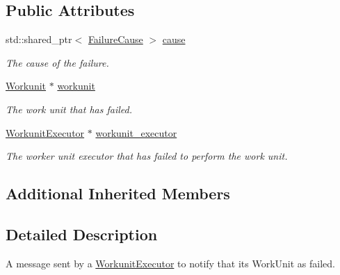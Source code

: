 \subsection*{Public Attributes}
\begin{DoxyCompactItemize}
\item 
\mbox{\label{classwrench_1_1_workunit_executor_failed_message_a9fa7d3a3c3e72e9b1cb714ecf885f67b}} 
std\+::shared\+\_\+ptr$<$ \hyperlink{classwrench_1_1_failure_cause}{Failure\+Cause} $>$ \hyperlink{classwrench_1_1_workunit_executor_failed_message_a9fa7d3a3c3e72e9b1cb714ecf885f67b}{cause}
\begin{DoxyCompactList}\small\item\em The cause of the failure. \end{DoxyCompactList}\item 
\mbox{\label{classwrench_1_1_workunit_executor_failed_message_ad7edddc605eee420e1eb7771e90f4aae}} 
\hyperlink{classwrench_1_1_workunit}{Workunit} $\ast$ \hyperlink{classwrench_1_1_workunit_executor_failed_message_ad7edddc605eee420e1eb7771e90f4aae}{workunit}
\begin{DoxyCompactList}\small\item\em The work unit that has failed. \end{DoxyCompactList}\item 
\mbox{\label{classwrench_1_1_workunit_executor_failed_message_a5fdf3e8cc5c39106cd884313b60e35f0}} 
\hyperlink{classwrench_1_1_workunit_executor}{Workunit\+Executor} $\ast$ \hyperlink{classwrench_1_1_workunit_executor_failed_message_a5fdf3e8cc5c39106cd884313b60e35f0}{workunit\+\_\+executor}
\begin{DoxyCompactList}\small\item\em The worker unit executor that has failed to perform the work unit. \end{DoxyCompactList}\end{DoxyCompactItemize}
\subsection*{Additional Inherited Members}


\subsection{Detailed Description}
A message sent by a \hyperlink{classwrench_1_1_workunit_executor}{Workunit\+Executor} to notify that its Work\+Unit as failed. 

